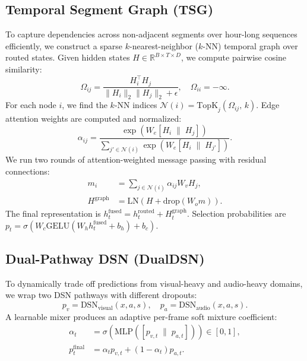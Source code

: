 \documentclass[letterpaper]{article} %
\begin{document}
\subsection{Temporal Segment Graph (TSG)}
To capture dependencies across non-adjacent segments over hour-long sequences efficiently, we construct a sparse $k$-nearest-neighbor ($k$-NN) temporal graph over routed states. Given hidden states $H \in \mathbb{R}^{B \times T \times D}$, we compute pairwise cosine similarity:
\begin{equation}
    \Omega_{ij} = \frac{H_i^\top H_j}{\|H_i\|_2 \|H_j\|_2 + \epsilon}, \quad \Omega_{ii} = -\infty.
\end{equation}
For each node $i$, we find the $k$-NN indices $\mathcal{N}(i) = \text{TopK}_j(\Omega_{ij},\, k)$. Edge attention weights are computed and normalized:
\begin{equation}
    \alpha_{ij} = \frac{\exp(W_e [H_i \;\|\; H_j])}{\sum_{j' \in \mathcal{N}(i)} \exp(W_e [H_i \;\|\; H_{j'}])}.
\end{equation}
We run two rounds of attention-weighted message passing with residual connections:
\begin{align}
    m_i &= \sum_{j \in \mathcal{N}(i)} \alpha_{ij} W_v H_j, \\
    H^{\text{graph}} &= \text{LN}\left(H + \text{drop}(W_o m)\right).
\end{align}
The final representation is $h_t^{\text{fused}} = h_t^{\text{routed}} + H^{\text{graph}}_t$. Selection probabilities are $p_t = \sigma(W_c \text{GELU}(W_h h_t^{\text{fused}} + b_h) + b_c)$.

\subsection{Dual-Pathway DSN (DualDSN)}
To dynamically trade off predictions from visual-heavy and audio-heavy domains, we wrap two DSN pathways with different dropouts:
\begin{equation}
    p_v = \text{DSN}_{\text{visual}}(x, a, s), \quad p_a = \text{DSN}_{\text{audio}}(x, a, s).
\end{equation}
A learnable mixer produces an adaptive per-frame soft mixture coefficient:
\begin{align}
    \alpha_t &= \sigma\left(\text{MLP}\left([p_{v,t} \;\|\; p_{a,t}]\right)\right) \in [0, 1], \\
    p_t^{\text{final}} &= \alpha_t p_{v,t} + (1 - \alpha_t) p_{a,t}.
\end{align}
\end{document}
